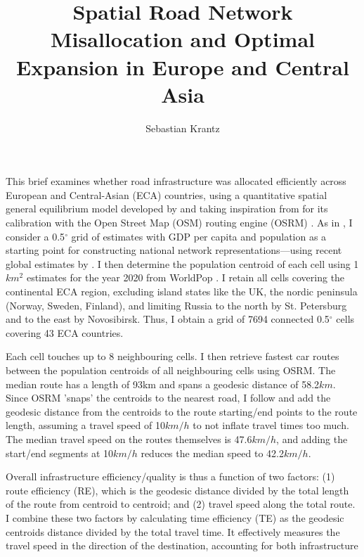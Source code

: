 \documentclass[a4paper]{article}
\title{\textbf{Spatial Road Network Misallocation and Optimal Expansion in Europe and Central Asia}}
\author{Sebastian Krantz}
\begin{document}
\maketitle

This brief examines whether road infrastructure was allocated efficiently across European and Central-Asian (ECA) countries, using a quantitative spatial general equilibrium model developed by \citet{fajgelbaum2020optimal} and taking inspiration from \citet{graff2024spatial} for its calibration with the Open Street Map (OSM) routing engine (OSRM) \citep{luxen-vetter-2011}. As in \citet{fajgelbaum2020optimal}, I consider a 0.5$^\circ$ grid of estimates with GDP per capita and population as a starting point for constructing national network representations---using recent global estimates by \citet{LGEAW}. I then determine the population centroid of each cell using 1$km^2$ estimates for the year 2020 from WorldPop \citep{tatem2017worldpop}. I retain all cells covering the continental ECA region, excluding island states like the UK, the nordic peninsula (Norway, Sweden, Finland), and limiting Russia to the north by St. Petersburg and to the east by Novosibirsk. Thus, I obtain a grid of 7694 connected 0.5$^\circ$ cells covering 43 ECA countries. \newline 

Each cell touches up to 8 neighbouring cells. I then retrieve fastest car routes between the population centroids of all neighbouring cells using OSRM. The median route has a length of 93km and spans a geodesic distance of 58.2$km$. Since OSRM 'snaps' the centroids to the nearest road, I follow \citet{graff2024spatial} and add the geodesic distance from the centroids to the route starting/end points to the route length, assuming a travel speed of 10$km/h$ to not inflate travel times too much. The median travel speed on the routes themselves is 47.6$km/h$, and adding the start/end segments at 10$km/h$ reduces the median speed to 42.2$km/h$. \newline 

 Overall infrastructure efficiency/quality is thus a function of two factors: (1) route efficiency (RE), which is the geodesic distance divided by the total length of the route from centroid to centroid; and (2) travel speed along the total route. I combine these two factors by calculating time efficiency (TE) as the geodesic centroids distance divided by the total travel time. It effectively measures the travel speed in the direction of the destination, accounting for both infrastructure 
 
\end{document}
